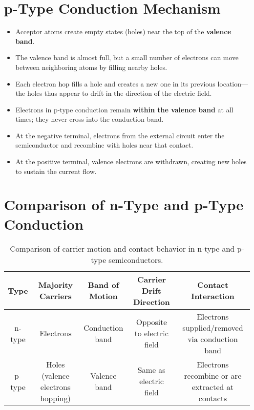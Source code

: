 \documentclass[12pt]{article}
\begin{document}
	\section{p-Type Conduction Mechanism}
	\begin{itemize}
		\item Acceptor atoms create empty states (holes) near the top of the \textbf{valence band}.
		\item The valence band is almost full, but a small number of electrons can move between neighboring atoms by filling nearby holes.
		\item Each electron hop fills a hole and creates a new one in its previous location---the holes thus appear to drift in the direction of the electric field.
		\item Electrons in p-type conduction remain \textbf{within the valence band} at all times; they never cross into the conduction band.
		\item At the negative terminal, electrons from the external circuit enter the semiconductor and recombine with holes near that contact.
		\item At the positive terminal, valence electrons are withdrawn, creating new holes to sustain the current flow.
	\end{itemize}
	
	\section{Comparison of n-Type and p-Type Conduction}
	\begin{table}[h!]
		\centering
		\renewcommand{\arraystretch}{1.2}
		\begin{tabular}{|c|c|c|c|c|}
			\hline
			\textbf{Type} & \textbf{Majority Carriers} & \textbf{Band of Motion} & \textbf{Carrier Drift Direction} & \textbf{Contact Interaction} \\
			\hline
			n-type & Electrons & Conduction band & Opposite to electric field & Electrons supplied/removed via conduction band \\
			\hline
			p-type & Holes (valence electrons hopping) & Valence band & Same as electric field & Electrons recombine or are extracted at contacts \\
			\hline
		\end{tabular}
		\caption{Comparison of carrier motion and contact behavior in n-type and p-type semiconductors.}
	\end{table}
	
\end{document}
